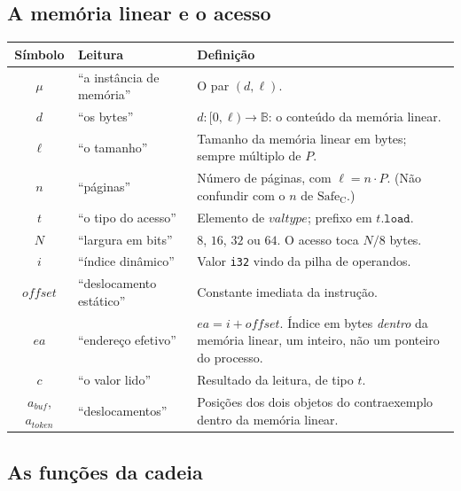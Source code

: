 \documentclass[11pt,a4paper]{article}
\theoremstyle{definition}
\newcommand{\Safe}{\mathrm{Safe}}
\newcommand{\code}[1]{\texttt{#1}}
\begin{document}
\subsection{A memória linear e o acesso}

\begin{tabularx}{\textwidth}{@{}c l X@{}}
\toprule
\textbf{Símbolo} & \textbf{Leitura} & \textbf{Definição} \\
\midrule
$\mu$ & ``a instância de memória'' & O par $(d, \ell)$. \\
$d$ & ``os bytes'' & $d : [0,\ell) \to \mathbb{B}$: o conteúdo da memória linear. \\
$\ell$ & ``o tamanho'' & Tamanho da memória linear em bytes; sempre múltiplo de $P$. \\
$n$ & ``páginas'' & Número de páginas, com $\ell = n \cdot P$. (Não confundir com o $n$ de $\Safe_{\mathrm{C}}$.) \\
$t$ & ``o tipo do acesso'' & Elemento de $\mathit{valtype}$; prefixo em $t.\mathtt{load}$. \\
$N$ & ``largura em bits'' & $8$, $16$, $32$ ou $64$. O acesso toca $N/8$ bytes. \\
$i$ & ``índice dinâmico'' & Valor \code{i32} vindo da pilha de operandos. \\
$\mathit{offset}$ & ``deslocamento estático'' & Constante imediata da instrução. \\
$ea$ & ``endereço efetivo'' & $ea = i + \mathit{offset}$. Índice em bytes \emph{dentro} da memória linear, um inteiro, não um ponteiro do processo. \\
$c$ & ``o valor lido'' & Resultado da leitura, de tipo $t$. \\
$a_{\mathit{buf}}$, $a_{\mathit{token}}$ & ``deslocamentos'' & Posições dos dois objetos do contraexemplo dentro da memória linear. \\
\bottomrule
\end{tabularx}

\subsection{As funções da cadeia}
\end{document}
